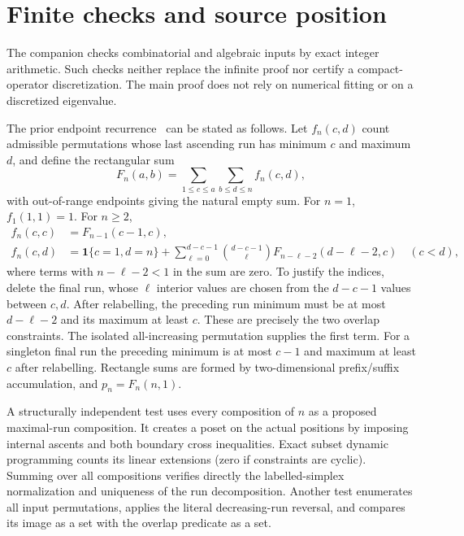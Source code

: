 \documentclass[11pt,letterpaper]{article}
\numberwithin{equation}{section}
\theoremstyle{remark}\newtheorem{remark}[theorem]{Remark}
\newcommand{\one}{\mathbf1}
\begin{document}
\section{Finite checks and source position}\label{psp:op:sec:sources}
The companion checks combinatorial and algebraic inputs by exact
integer arithmetic. Such checks neither replace the infinite proof
nor certify a compact-operator discretization. The main proof does
not rely on numerical fitting or on a discretized eigenvalue.

The prior endpoint recurrence~\cite{cgp} can be stated as follows.
Let $f_n(c,d)$ count admissible permutations whose last ascending
run has minimum $c$ and maximum $d$, and define the rectangular sum
\[
 F_n(a,b)=\sum_{1\leq c\leq a}\sum_{b\leq d\leq n}f_n(c,d),
\]
with out-of-range endpoints giving the natural empty sum. For $n=1$,
$f_1(1,1)=1$. For $n\geq2$,
\begin{align}
 f_n(c,c)&=F_{n-1}(c-1,c),\label{psp:op:eq:recursingle}\\
 f_n(c,d)&=\one\{c=1,d=n\}
 +\sum_{\ell=0}^{d-c-1}\binom{d-c-1}{\ell}
       F_{n-\ell-2}(d-\ell-2,c)\quad(c<d),\label{psp:op:eq:recurmulti}
\end{align}
where terms with $n-\ell-2<1$ in the sum are zero. To justify the
indices, delete the final run, whose $\ell$ interior values are
chosen from the $d-c-1$ values between $c,d$. After relabelling,
the preceding run minimum must be at most $d-\ell-2$ and its maximum
at least $c$. These are precisely the two overlap constraints.
The isolated all-increasing permutation supplies the first term.
For a singleton final run the preceding minimum is at most $c-1$
and maximum at least $c$ after relabelling. Rectangle sums are formed
by two-dimensional prefix/suffix accumulation, and $p_n=F_n(n,1)$.

A structurally independent test uses every composition of $n$ as a
proposed maximal-run composition. It creates a poset on the actual
positions by imposing internal ascents and both boundary cross
inequalities. Exact subset dynamic programming counts its linear
extensions (zero if constraints are cyclic). Summing over all
compositions verifies directly the labelled-simplex normalization
and uniqueness of the run decomposition. Another test enumerates
all input permutations, applies the literal decreasing-run reversal,
and compares its image as a set with the overlap predicate as a set.
\end{document}
